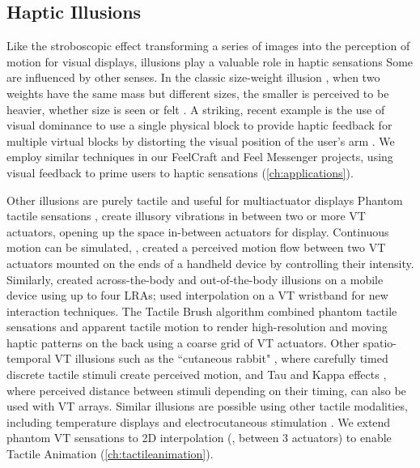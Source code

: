 \subsection{Haptic Illusions}
Like the stroboscopic effect transforming a series of images into the perception of motion for visual displays, illusions play a valuable role in haptic sensations \cite{Hayward2016}\osE{:}
Some are influenced by other senses.
In the classic size-weight illusion \cite{charpentier1891analyse}, when two weights have the same mass but different sizes, the smaller is perceived to be heavier, whether size is seen or felt \cite{Hayward2016}.
A striking, recent example is the use of visual dominance to use a single physical block to provide haptic feedback for multiple virtual blocks by distorting the visual position of the user's arm \cite{Azmandian2016}.
We employ similar techniques in our FeelCraft and Feel Messenger projects, using visual feedback to prime users to haptic sensations (\autoref{ch:applications}).

Other illusions are purely tactile and useful for multiactuator displays
Phantom tactile sensations \cite{Alles1970}, create illusory vibrations in between two or more VT actuators, opening up the space in-between actuators for display.
Continuous motion can be simulated, \eg, \citet{Seo2010} created a perceived motion flow between two VT actuators mounted on the ends of a handheld device by controlling their intensity.
Similarly, \citet{Lee2012a} created across-the-body and out-of-the-body illusions on a mobile device using up to four %
LRAs; \citet{Gupta2016} used interpolation on a VT wristband for new interaction techniques.
The Tactile Brush algorithm \cite{Israr2011a} combined phantom tactile sensations and apparent tactile motion to render high-resolution and moving haptic patterns on the back using a coarse grid of VT actuators. 
Other spatio-temporal VT illusions such as the ``cutaneous rabbit"  \cite{Tan2009}, where carefully timed discrete tactile stimuli create perceived motion, and Tau and Kappa effects \cite{Hayward2008,Hayward2016}, where perceived distance between stimuli depending on their timing, can also be used with VT arrays.
Similar illusions are possible using other tactile modalities, including temperature displays \cite{Singhal2016} and electrocutaneous stimulation \cite{Tanie1980}.
We extend phantom VT sensations to 2D interpolation (\eg, between 3 actuators) to enable Tactile Animation (\autoref{ch:tactileanimation}).


